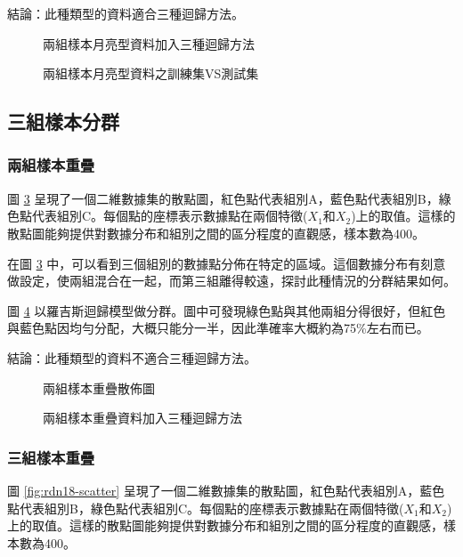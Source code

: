 \documentclass[12pt, a4paper]{article}
\begin{document}
結論：此種類型的資料適合三種迴歸方法。
\begin{figure}[H]
    \caption{兩組樣本月亮型資料加入三種迴歸方法}
    \label{fig:rdn16-LARline}
\end{figure}
\begin{figure}[H]
    \caption{兩組樣本月亮型資料之訓練集VS測試集}
    \label{fig:rdn16-LARline2}
\end{figure}
\subsection{三組樣本分群}
\subsubsection{兩組樣本重疊}
圖 \ref{fig:rdn17-scatter} 呈現了一個二維數據集的散點圖，紅色點代表組別A，藍色點代表組別B，綠色點代表組別C。每個點的座標表示數據點在兩個特徵($X_1$和$X_2$)上的取值。這樣的散點圖能夠提供對數據分布和組別之間的區分程度的直觀感，樣本數為400。

在圖 \ref{fig:rdn17-scatter} 中，可以看到三個組別的數據點分佈在特定的區域。這個數據分布有刻意做設定，使兩組混合在一起，而第三組離得較遠，探討此種情況的分群結果如何。

圖 \ref{fig:rdn17-LR-result} 以羅吉斯迴歸模型做分群。圖中可發現綠色點與其他兩組分得很好，但紅色與藍色點因均勻分配，大概只能分一半，因此準確率大概約為75\%左右而已。

結論：此種類型的資料不適合三種迴歸方法。

\begin{figure}[H]
    \caption{兩組樣本重疊散佈圖}
    \label{fig:rdn17-scatter}
\end{figure}

\begin{figure}[H]
    \caption{兩組樣本重疊資料加入三種迴歸方法}
    \label{fig:rdn17-LR-result}
\end{figure}


\subsubsection{三組樣本重疊}
圖 \ref{fig:rdn18-scatter} 呈現了一個二維數據集的散點圖，紅色點代表組別A，藍色點代表組別B，綠色點代表組別C。每個點的座標表示數據點在兩個特徵($X_1$和$X_2$)上的取值。這樣的散點圖能夠提供對數據分布和組別之間的區分程度的直觀感，樣本數為400。
\end{document}
